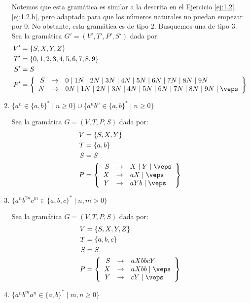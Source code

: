 \begin{ejercicio}
\begin{enumerate}
        Notemos que esta gramática es similar a la descrita en el Ejercicio \ref{ej:1.2}.\ref{ej:1.2.b}, pero adaptada para que los números naturales no puedan empezar por $0$.
        No obstante, esta gramática es de tipo $2$. Busquemos una de tipo $3$.
        Sea la gramática $G'=\left(V',T',P',S'\right)$ dada por:
        \begin{align*}
            V' &= \{S, X, Y, Z\} \\
            T' &= \{0,1,2,3,4,5,6,7,8,9\} \\
            S' &= S \\
            P' &= \left\{
                \begin{array}{rcl}
                    S &\rightarrow & 0 \mid 1N \mid 2N \mid 3N \mid 4N \mid 5N \mid 6N \mid 7N \mid 8N \mid 9N\\
                    N &\rightarrow & 0N\mid 1N \mid 2N \mid 3N \mid 4N \mid 5N \mid 6N \mid 7N \mid 8N \mid 9N \mid \veps
                \end{array}
            \right\}
        \end{align*}
        \item $\{ a^n \in \{a,b\}^\ast \mid n\geq 0 \} \cup \{ a^nb^n \in \{a,b\}^\ast \mid n\geq 0 \}$
        
        Sea la gramática $G=\left(V,T,P,S\right)$ dada por:
        \begin{align*}
            V &= \{S, X, Y\} \\
            T &= \{a,b\} \\
            S &= S \\
            P &= \left\{
                \begin{array}{rcl}
                    S &\rightarrow & X \mid Y \mid \veps \\
                    X &\rightarrow & aX \mid \veps \\
                    Y &\rightarrow & aYb \mid \veps
                \end{array}
            \right\}
        \end{align*}
        \item $\{ a^nb^{2n}c^m \in \{a,b,c\}^\ast \mid n,m>0 \}$
        
        Sea la gramática $G=\left(V,T,P,S\right)$ dada por:
        \begin{align*}
            V &= \{S, X, Y, Z\} \\
            T &= \{a,b,c\} \\
            S &= S \\
            P &= \left\{
                \begin{array}{rcl}
                    S &\rightarrow & aXbbcY \\
                    X &\rightarrow & aXbb \mid \veps \\
                    Y &\rightarrow & cY \mid \veps
                \end{array}
            \right\}
        \end{align*}
        \item $\{ a^nb^ma^n \in \{a,b\}^\ast \mid m,n\geq 0 \}$
        

\end{enumerate}
\end{ejercicio}
